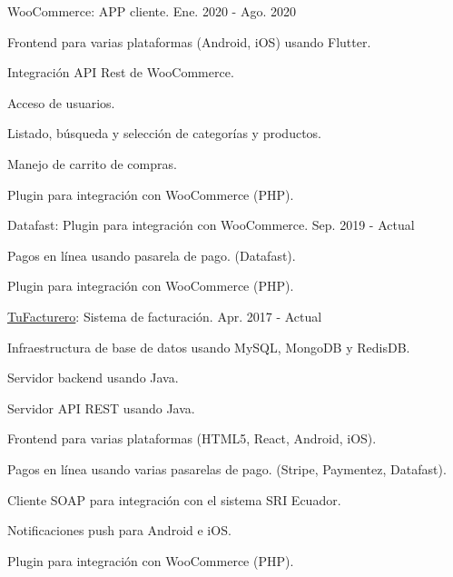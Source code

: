 \begin{cventries}
  \cventry
    {WooCommerce: APP cliente.} %
    {} %
    {} %
    {Ene. 2020 - Ago. 2020} %
    {
      \begin{cvitems} %
        \item {Frontend para varias plataformas (Android, iOS) usando Flutter.}
        \item {Integración API Rest de WooCommerce.}
        \item {Acceso de usuarios.}
        \item {Listado, búsqueda y selección de categorías y productos.}
        \item {Manejo de carrito de compras.}
        \item {Plugin para integración con WooCommerce (PHP).}
      \end{cvitems}
    }

  \cventry
    {Datafast: Plugin para integración con WooCommerce.} %
    {} %
    {} %
    {Sep. 2019 - Actual} %
    {
      \begin{cvitems} %
        \item {Pagos en línea usando pasarela de pago. (Datafast).}
        \item {Plugin para integración con WooCommerce (PHP).}
      \end{cvitems}
    }

  \cventry
    {\href{https://tufacturero.ec}{TuFacturero}: Sistema de facturación.} %
    {} %
    {} %
    {Apr. 2017 - Actual} %
    {
      \begin{cvitems} %
        \item {Infraestructura de base de datos usando MySQL, MongoDB y RedisDB.}
        \item {Servidor backend usando Java.}
        \item {Servidor API REST usando Java.}
        \item {Frontend para varias plataformas (HTML5, React, Android, iOS).}
        \item {Pagos en línea usando varias pasarelas de pago. (Stripe, Paymentez, Datafast).}
        \item {Cliente SOAP para integración con el sistema SRI Ecuador.}
        \item {Notificaciones push para Android e iOS.}
        \item {Plugin para integración con WooCommerce (PHP).}
      \end{cvitems}
    }


\end{cventries}
